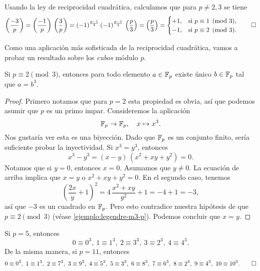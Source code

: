 \documentclass{article}
\theoremstyle{plain}
\begin{document}
\begin{ejemplo}
  \label{ejemplo:legendre-m3-p}
  Usando la ley de reciprocidad cuadrática, calculamos que para $p \ne 2,3$ se
  tiene
  \[ \left(\frac{-3}{p}\right) = \left(\frac{-1}{p}\right)\,\left(\frac{3}{p}\right) =
    (-1)^{\frac{p-1}{4}}\,(-1)^{\frac{p-1}{4}}\,\left(\frac{p}{3}\right) =
    \left(\frac{p}{3}\right) = \begin{cases}
      +1, & \text{si }p \equiv 1 \pmod{3},\\
      -1, & \text{si }p \equiv 2 \pmod{3}.
    \end{cases} \qedhere \]
\end{ejemplo}

Como una aplicación más sofisticada de la reciprocidad cuadrática, vamos a
probar un resultado sobre los \emph{cubos} módulo $p$.

\begin{proposicion}
  Si $p \equiv 2 \pmod{3}$, entonces para todo elemento $a \in \mathbb{F}_p$ existe
  único $b \in \mathbb{F}_p$ tal que $a = b^3$.

  \begin{proof}
    Primero notamos que para $p = 2$ esta propiedad es obvia, así que podemos
    asumir que $p$ es un primo impar. Consideremos la aplicación
    $$\mathbb{F}_p \to \mathbb{F}_p, \quad x \mapsto x^3.$$
    Nos gustaría ver esta es una biyección. Dado que $\mathbb{F}_p$ es un conjunto
    finito, sería suficiente probar la inyectividad. Si $x^3 = y^3$, entonces
    $$x^3 - y^3 = (x-y)\,(x^2 + xy + y^2) = 0.$$
    Notamos que si $y = 0$, entonces $x = 0$. Asumamos que $y \ne 0$. La
    ecuación de arriba implica que $x=y$ o $x^2 + xy + y^2 = 0$. En el segundo
    caso, tenemos
    $$\left(\frac{2x}{y}+1\right)^2 = 4\,\frac{x^2 + xy}{y^2} + 1 = -4 + 1 = -3,$$
    así que $-3$ es un cuadrado en $\mathbb{F}_p$. Pero esto contradice nuestra
    hipótesis de que $p \equiv 2 \pmod{3}$ (véase
    \ref{ejemplo:legendre-m3-p}). Podemos concluir que $x=y$.
  \end{proof}
\end{proposicion}

\begin{ejemplo}
  Si $p = 5$, entonces
  $$0 \equiv 0^3, ~ 1 \equiv 1^3, ~ 2 \equiv 3^3, ~ 3 \equiv 2^3, ~ 4 \equiv 4^3.$$
  De la misma manera, si $p = 11$, entonces
  \[ 0 \equiv 0^3, ~ 1 \equiv 1^3, ~ 2 \equiv 7^3, ~ 3 \equiv 9^3, ~
    4 \equiv 5^3, ~ 5 \equiv 3^3, ~ 6 \equiv 8^3, ~ 7 \equiv 6^3, ~
    8 \equiv 2^3, ~ 9 \equiv 4^3, ~ 10 \equiv 10^3. \qedhere \]
\end{ejemplo}
\end{document}
